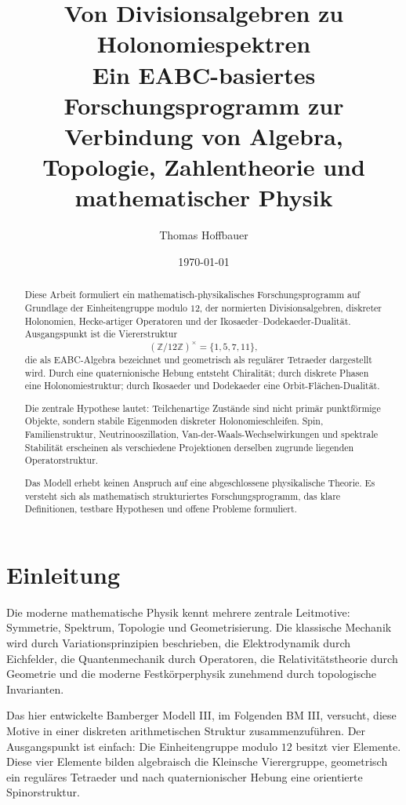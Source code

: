 \documentclass[11pt,a4paper]{article}
\title{
	Von Divisionsalgebren zu Holonomiespektren\\
	\large Ein EABC-basiertes Forschungsprogramm zur Verbindung von Algebra, Topologie, Zahlentheorie und mathematischer Physik
}
\author{Thomas Hoffbauer}
\date{\today}
\theoremstyle{definition}
\begin{document}
	
	\maketitle
	
	\begin{abstract}
		Diese Arbeit formuliert ein mathematisch-physikalisches Forschungsprogramm auf Grundlage der Einheitengruppe modulo \(12\), der normierten Divisionsalgebren, diskreter Holonomien, Hecke-artiger Operatoren und der Ikosaeder--Dodekaeder-Dualität. Ausgangspunkt ist die Viererstruktur
		\[
		(\mathbb Z/12\mathbb Z)^\times=\{1,5,7,11\},
		\]
		die als EABC-Algebra bezeichnet und geometrisch als regulärer Tetraeder dargestellt wird. Durch eine quaternionische Hebung entsteht Chiralität; durch diskrete Phasen eine Holonomiestruktur; durch Ikosaeder und Dodekaeder eine Orbit-Flächen-Dualität.
		
		Die zentrale Hypothese lautet: Teilchenartige Zustände sind nicht primär punktförmige Objekte, sondern stabile Eigenmoden diskreter Holonomieschleifen. Spin, Familienstruktur, Neutrinooszillation, Van-der-Waals-Wechselwirkungen und spektrale Stabilität erscheinen als verschiedene Projektionen derselben zugrunde liegenden Operatorstruktur.
		
		Das Modell erhebt keinen Anspruch auf eine abgeschlossene physikalische Theorie. Es versteht sich als mathematisch strukturiertes Forschungsprogramm, das klare Definitionen, testbare Hypothesen und offene Probleme formuliert.
	\end{abstract}
	
	\tableofcontents
	
	\newpage
	
	\section{Einleitung}
	
	Die moderne mathematische Physik kennt mehrere zentrale Leitmotive: Symmetrie, Spektrum, Topologie und Geometrisierung. Die klassische Mechanik wird durch Variationsprinzipien beschrieben, die Elektrodynamik durch Eichfelder, die Quantenmechanik durch Operatoren, die Relativitätstheorie durch Geometrie und die moderne Festkörperphysik zunehmend durch topologische Invarianten.
	
	Das hier entwickelte Bamberger Modell III, im Folgenden BM III, versucht, diese Motive in einer diskreten arithmetischen Struktur zusammenzuführen. Der Ausgangspunkt ist einfach: Die Einheitengruppe modulo \(12\) besitzt vier Elemente. Diese vier Elemente bilden algebraisch die Kleinsche Vierergruppe, geometrisch ein reguläres Tetraeder und nach quaternionischer Hebung eine orientierte Spinorstruktur.
	
\end{document}
